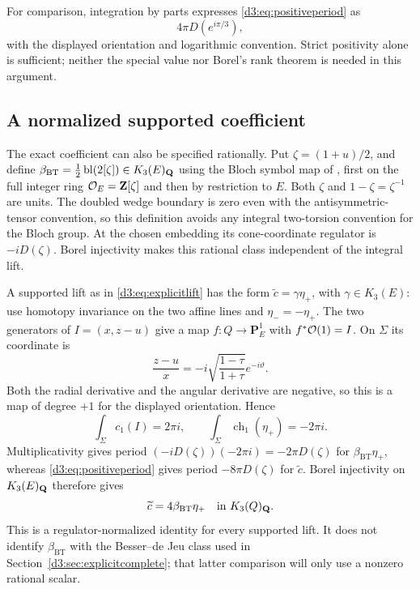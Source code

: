 For comparison, integration by parts expresses \eqref{d3:eq:positiveperiod} as
\[
4\pi D(e^{i\pi/3}),
\]
with the displayed orientation and logarithmic convention. Strict positivity alone is sufficient; neither the special value nor Borel's rank theorem is needed in this argument.

\subsection{A normalized supported coefficient}\label{d3:sec:exactcoefficient}
The exact coefficient can also be specified rationally. Put $\zeta=(1+u)/2$, and define $\beta_{\mathrm{BT}}=\tfrac12\operatorname{bl}(2[\zeta])\in K_3(E)_{\mathbf Q}$ using the Bloch symbol map of \cite[Theorem~4.9 and (4.8)]{BunkeTamme}, first on the full integer ring $\mathcal O_E=\mathbf Z[\zeta]$ and then by restriction to $E$. Both $\zeta$ and $1-\zeta=\zeta^{-1}$ are units. The doubled wedge boundary is zero even with the antisymmetric-tensor convention, so this definition avoids any integral two-torsion convention for the Bloch group. At the chosen embedding its cone-coordinate regulator is $-iD(\zeta)$. Borel injectivity \cite[Section~6]{BunkeTamme} makes this rational class independent of the integral lift.

A supported lift as in \eqref{d3:eq:explicitlift} has the form $\widetilde c=\gamma\eta_+$, with $\gamma\in K_3(E)$: use homotopy invariance on the two affine lines and $\eta_-=-\eta_+$. The two generators of $I=(x,z-u)$ give a map $f:Q\to\mathbf P^1_E$ with $f^*\mathcal O(1)=I$. On $\Sigma$ its coordinate is
\[
\frac{z-u}{x}=-i\sqrt{\frac{1-\tau}{1+\tau}}e^{-i\vartheta}.
\]
Both the radial derivative and the angular derivative are negative, so this is a map of degree $+1$ for the displayed orientation. Hence
\[
\int_\Sigma c_1(I)=2\pi i,\qquad
\int_\Sigma\operatorname{ch}_1(\eta_+)=-2\pi i.
\]
Multiplicativity gives period $(-iD(\zeta))(-2\pi i)=-2\pi D(\zeta)$ for $\beta_{\mathrm{BT}}\eta_+$, whereas \eqref{d3:eq:positiveperiod} gives period $-8\pi D(\zeta)$ for $\widetilde c$. Borel injectivity on $K_3(E)_{\mathbf Q}$ therefore gives
\begin{equation}\label{d3:eq:exactcoefficient}
\widetilde c=4\beta_{\mathrm{BT}}\eta_+
\quad\text{in }K_3(Q)_{\mathbf Q}.
\end{equation}
This is a regulator-normalized identity for every supported lift. It does not identify $\beta_{\mathrm{BT}}$ with the Besser--de Jeu class used in Section~\ref{d3:sec:explicitcomplete}; that latter comparison will only use a nonzero rational scalar.

